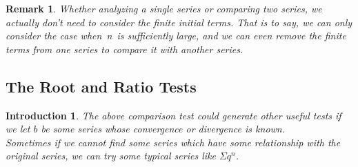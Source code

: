\documentclass[12pt]{article}
\theoremstyle{oneline}
\newtheorem{remark}{Remark}[subsection]
\theoremstyle{twoline}
\newtheorem{introduction}{Introduction}
\begin{document}
\begin{remark}
  Whether analyzing a single series or comparing two series, we actually don't need to consider the finite initial terms. That is to say, we can only consider the case when n is sufficiently large, and we can even remove the finite terms from one series to compare it with another series.
\end{remark}

\subsection{The Root and Ratio Tests}
\begin{introduction}
  \hspace*{2em}
  The above comparison test could generate other useful tests if we let $b$ be some series whose convergence or divergence is known.\\
  \hspace*{2em} 
  Sometimes if we cannot find some series which have some relationship with the original series, we can try some typical series like $\Sigma q^n $.
\end{introduction}
\end{document}
